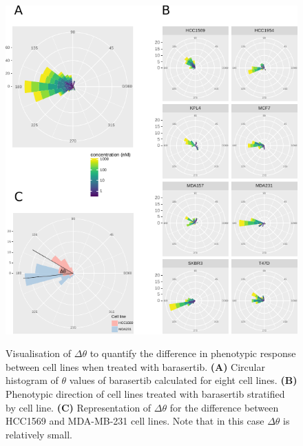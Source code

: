 \documentclass[a4paper,11pt,twoside,openright]{scrbook}
\begin{document}
\begin{figure}
    \captionsetup{width=0.8\textwidth}
    \caption[Visualisation of $\Delta\theta$ to quantify the difference in phenotypic direction between cell lines]{
Visualisation of $\Delta\theta$ to quantify the difference in phenotypic response between cell lines when treated with 
barasertib.
\textbf{(A)} Circular histogram of $\theta$ values of barasertib calculated for eight cell lines.
\textbf{(B)} Phenotypic direction of cell lines treated with barasertib stratified by cell line.
\textbf{(C)} Representation of $\Delta\theta$ for the difference between HCC1569 and MDA-MB-231 cell lines. Note that 
in this case $\Delta\theta$ is relatively small.
}
    \includegraphics[scale=1.15]{figs/ch3tccsCellLines}
    \label{figure:theta_cell_lines}
\end{figure}
\end{document}

